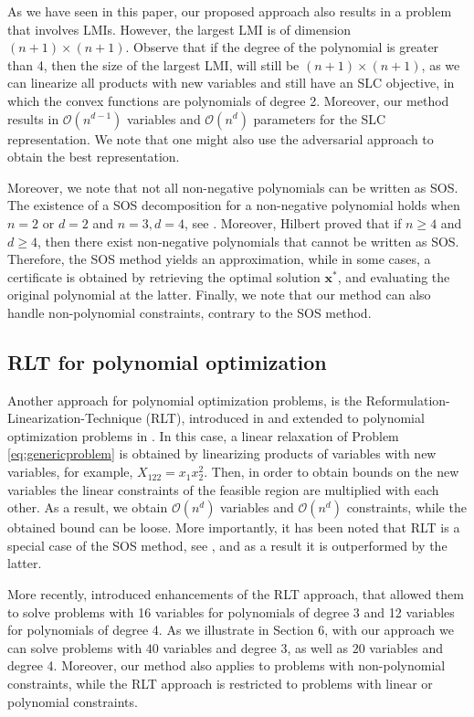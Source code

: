 \documentclass[opre,nonblindrev]{informs3} %
\begin{document}
As we have seen in this paper, our proposed approach also results in a problem that involves LMIs. However, the largest LMI is of dimension $(n+1) \times (n+1)$. Observe that if the degree of the polynomial is greater than 4, then the size of the largest LMI, will still be $(n+1) \times (n+1)$, as we can linearize all products with new variables and still have an SLC objective, in which the convex functions are polynomials of degree 2. Moreover, our method results in $\mathcal{O}(n^{d-1})$ variables and $\mathcal{O}(n^d)$ parameters for the SLC representation. We note that one might also use the adversarial approach to obtain the best representation. 
 
Moreover, we note that not all non-negative polynomials can be written as SOS. The existence of a SOS decomposition for a non-negative polynomial holds when $n=2$ or $d=2$ and $n=3,d=4$, see \cite{reznick2000some}. Moreover, Hilbert proved that if $n \ge 4$ and $d \ge 4$, then there exist non-negative polynomials that cannot be written as SOS. {\color{black} Therefore, the SOS method yields an approximation, while in some cases, a certificate is obtained by retrieving the optimal solution $\boldsymbol{x}^*$, and evaluating the original polynomial at the latter. Finally, we note that our method can also handle non-polynomial constraints, contrary to the SOS method.}

\subsection{RLT for polynomial optimization}  
Another approach for polynomial optimization problems, is the Reformulation-Linearization-Technique (RLT), introduced in \cite{sa90} and extended to polynomial optimization problems in \cite{sherali2013}. In this case, a linear relaxation of Problem \eqref{eq:genericproblem} is obtained by linearizing products of variables with new variables, for example, $X_{122} = x_1 x_2^2$. Then, in order to obtain bounds on the new variables the linear constraints of the feasible region are multiplied with each other. As a result, we obtain $\mathcal{O}(n^d)$ variables and $\mathcal{O}(n^d)$ constraints, while the obtained bound can be loose. More importantly, it has been noted that RLT is a special case of the SOS method, see \cite{parrilo2003semidefinite}, and as a result it is outperformed by the latter.

More recently, \cite{dalkiran2016rlt} introduced enhancements of the RLT approach, that allowed them to solve problems with 16 variables for polynomials of degree 3 and 12 variables for polynomials of degree 4. As we illustrate in Section 6, with our approach we can solve problems with $40$ variables and degree 3, as well as $20$ variables and degree 4. Moreover, our method also applies to problems with non-polynomial constraints, while the RLT approach is restricted to problems with linear or polynomial constraints.
\end{document}
